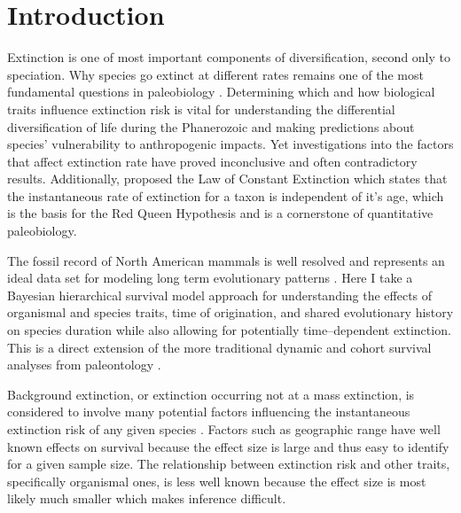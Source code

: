 \documentclass[12pt,letterpaper]{article}
\begin{document}
\section{Introduction}

Extinction is one of most important components of diversification, second only to speciation. Why species go extinct at different rates remains one of the most fundamental questions in paleobiology \citep{Simpson1944,VanValen1973,Raup1991b,Raup1994,Quental2013,Wagner2014b,Jablonski2005,Payne2007,Kitchell1986}. Determining which and how biological traits influence extinction risk is vital for understanding the differential diversification of life during the Phanerozoic and making predictions about species' vulnerability to anthropogenic impacts. Yet investigations into the factors that affect extinction rate have proved inconclusive and often contradictory results. Additionally, \citet{VanValen1973} proposed the Law of Constant Extinction which states that the instantaneous rate of extinction for a taxon is independent of it's age, which is the basis for the Red Queen Hypothesis and is a cornerstone of quantitative paleobiology.

The fossil record of North American mammals is well resolved and represents an ideal data set for modeling long term evolutionary patterns \citep{Quental2013,Alroy2009,Alroy1996a,Alroy1998,Alroy2000g,Simpson1944,Blois2009,Tomiya2013,Marcot2014}. Here I take a Bayesian hierarchical survival model approach for understanding the effects of organismal and species traits, time of origination, and shared evolutionary history on species duration while also allowing for potentially time--dependent extinction. This is a direct extension of the more traditional dynamic and cohort survival analyses from paleontology \citep{Simpson1944,VanValen1973,Foote1988,Raup1978,Raup1975,VanValen1979,Baumiller1993,Sepkoski1975}.

Background extinction, or extinction occurring not at a mass extinction, is considered to involve many potential factors influencing the instantaneous extinction risk of any given species \citep{Jablonski1986,Wang2003,Harnik2013,Kitchell1986,Nurnberg2013a,Payne2007}. Factors such as geographic range have well known effects on survival \citep{Payne2007,Jablonski1987} because the effect size is large and thus easy to identify for a given sample size. The relationship between extinction risk and other traits, specifically organismal ones, is less well known because the effect size is most likely much smaller which makes inference difficult.
\end{document}

